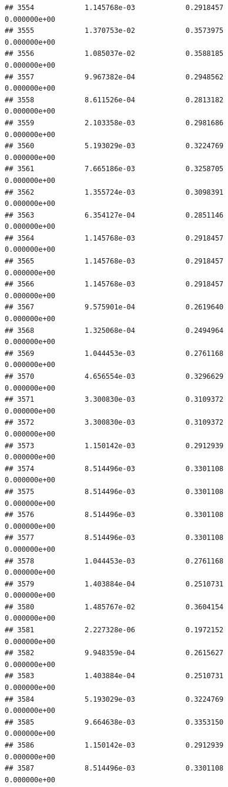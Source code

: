 \documentclass[
]{article}
\begin{document}
\begin{verbatim}
## 3554            1.145768e-03            0.2918457            0.000000e+00
## 3555            1.370753e-02            0.3573975            0.000000e+00
## 3556            1.085037e-02            0.3588185            0.000000e+00
## 3557            9.967382e-04            0.2948562            0.000000e+00
## 3558            8.611526e-04            0.2813182            0.000000e+00
## 3559            2.103358e-03            0.2981686            0.000000e+00
## 3560            5.193029e-03            0.3224769            0.000000e+00
## 3561            7.665186e-03            0.3258705            0.000000e+00
## 3562            1.355724e-03            0.3098391            0.000000e+00
## 3563            6.354127e-04            0.2851146            0.000000e+00
## 3564            1.145768e-03            0.2918457            0.000000e+00
## 3565            1.145768e-03            0.2918457            0.000000e+00
## 3566            1.145768e-03            0.2918457            0.000000e+00
## 3567            9.575901e-04            0.2619640            0.000000e+00
## 3568            1.325068e-04            0.2494964            0.000000e+00
## 3569            1.044453e-03            0.2761168            0.000000e+00
## 3570            4.656554e-03            0.3296629            0.000000e+00
## 3571            3.300830e-03            0.3109372            0.000000e+00
## 3572            3.300830e-03            0.3109372            0.000000e+00
## 3573            1.150142e-03            0.2912939            0.000000e+00
## 3574            8.514496e-03            0.3301108            0.000000e+00
## 3575            8.514496e-03            0.3301108            0.000000e+00
## 3576            8.514496e-03            0.3301108            0.000000e+00
## 3577            8.514496e-03            0.3301108            0.000000e+00
## 3578            1.044453e-03            0.2761168            0.000000e+00
## 3579            1.403884e-04            0.2510731            0.000000e+00
## 3580            1.485767e-02            0.3604154            0.000000e+00
## 3581            2.227328e-06            0.1972152            0.000000e+00
## 3582            9.948359e-04            0.2615627            0.000000e+00
## 3583            1.403884e-04            0.2510731            0.000000e+00
## 3584            5.193029e-03            0.3224769            0.000000e+00
## 3585            9.664638e-03            0.3353150            0.000000e+00
## 3586            1.150142e-03            0.2912939            0.000000e+00
## 3587            8.514496e-03            0.3301108            0.000000e+00

\end{verbatim}
\end{document}
